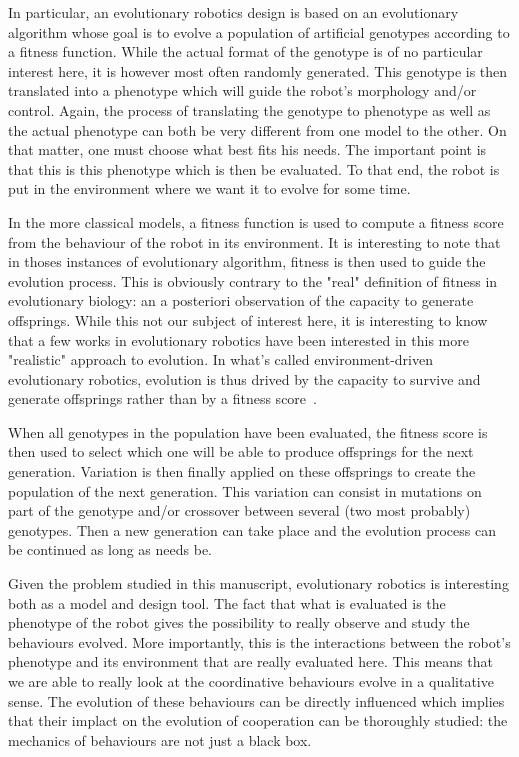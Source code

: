 
    In particular, an evolutionary robotics design is based on an evolutionary algorithm whose goal is to evolve a population of artificial genotypes according to a fitness function. While the actual format of the genotype is of no particular interest here, it is however most often randomly generated. This genotype is then translated into a phenotype which will guide the robot's morphology and/or control. Again, the process of translating the genotype to phenotype as well as the actual phenotype can both be very different from one model to the other. On that matter, one must choose what best fits his needs. The important point is that this is this phenotype which is then be evaluated. To that end, the robot is put in the environment where we want it to evolve for some time. 
    
    In the more classical models, a fitness function is used to compute a fitness score from the behaviour of the robot in its environment. It is interesting to note that in thoses instances of evolutionary algorithm, fitness is then used to guide the evolution process. This is obviously contrary to the "real" definition of fitness in evolutionary biology: an a posteriori observation of the capacity to generate offsprings. While this not our subject of interest here, it is interesting to know that a few works in evolutionary robotics have been interested in this more "realistic" approach to evolution. In what's called environment-driven evolutionary robotics, evolution is thus drived by the capacity to survive and generate offsprings rather than by a fitness score~\parencite{Ray1991, Bianco2004, Bredeche2010}.

    When all genotypes in the population have been evaluated, the fitness score is then used to select which one will be able to produce offsprings for the next generation. Variation is then finally applied on these offsprings to create the population of the next generation. This variation can consist in mutations on part of the genotype and/or crossover between several (two most probably) genotypes. Then a new generation can take place and the evolution process can be continued as long as needs be.

    Given the problem studied in this manuscript, evolutionary robotics is interesting both as a model and design tool. The fact that what is evaluated is the phenotype of the robot gives the possibility to really observe and study the behaviours evolved. More importantly, this is the interactions between the robot's phenotype and its environment that are really evaluated here. This means that we are able to really look at the coordinative behaviours evolve in a qualitative sense. The evolution of these behaviours can be directly influenced which implies that their implact on the evolution of cooperation can be thoroughly studied: the mechanics of behaviours are not just a black box.

